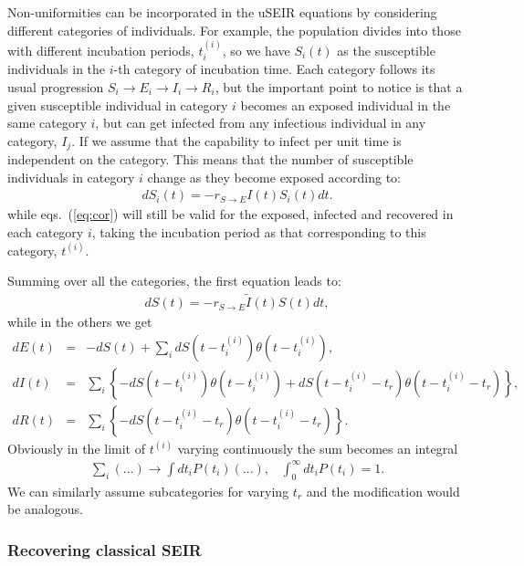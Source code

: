 \documentclass[a4paper,oneside,11pt]{article}
\begin{document}
 Non-uniformities can be incorporated in the uSEIR equations by considering different categories of individuals. For example, the population divides   into those with different incubation periods, $t_i^{(i)}$, so we have $S_i(t)$ as the susceptible individuals in the $i$-th category of incubation time. Each category follows its usual progression $S_i\rightarrow E_i \rightarrow I_i \rightarrow R_i$, but the important point to notice is that a given susceptible individual in category $i$ becomes an exposed individual in the same category $i$, but can get infected from any infectious individual in any category, $I_j$. If we assume that the capability to infect per unit time is independent on the category. This means that the number of susceptible individuals in category $i$ change as they become exposed according to:
\begin{eqnarray}
d S_i(t) = - r_{S\rightarrow E} I(t) S_i(t) dt.
\end{eqnarray}
while eqs.~(\ref{eq:cor}) will still be valid for the exposed, infected and recovered in each category $i$, taking the incubation period as that corresponding to this category, $t^{(i)}$.

Summing over all the categories, the first equation leads to:
\begin{eqnarray}
d S(t) = - r_{S\rightarrow E} \tilde{I}(t) S(t) dt,
\end{eqnarray}
while in the others we get
\begin{eqnarray}
d E(t) &=& -d S(t) + \sum_i d S(t-t^{(i)}_i) \theta(t-t^{(i)}_i) ,\nonumber\\
d I(t) &=& \sum_i  \left\{-d S(t-t^{(i)}_i) \theta(t-t^{(i)}_i)+ d S(t-t^{(i)}_i-t_r) \theta(t-t^{(i)}_i-t_r)\right\},\nonumber\\
d R(t) &=& \sum_i \left\{- d S(t - t^{(i)}_i - t_r) \theta(t-t^{(i)}_i-t_r)\right\}.\nonumber
\label{eqs:corint}
\end{eqnarray}
Obviously in the limit of $t^{(i)}$ varying continuously the sum becomes an integral
\begin{eqnarray}
\sum_i  (...) \rightarrow \int dt_i P(t_i) (...), \;\;\; \int_0^\infty dt_i P(t_i) = 1.
\end{eqnarray}
We can similarly assume subcategories for varying $t_r$ and the modification would be analogous.

\subsubsection{Recovering classical SEIR}
\end{document}

